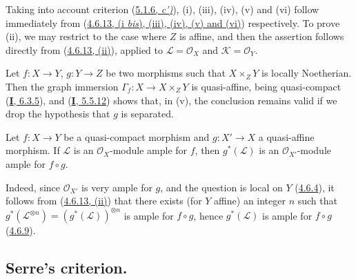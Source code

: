 Taking into account criterion (\hyperref[II.5.1.6]{5.1.6, \emph{c')}}), (i),
(iii), (iv), (v) and (vi) follow immediately from
(\hyperref[II.4.6.13]{4.6.13, (i \emph{bis}), (iii), (iv), (v) and (vi)})
respectively. To prove (ii), we may restrict to the case where $Z$ is
affine, and then the assertion follows directly from
(\hyperref[II.4.6.13]{4.6.13, (ii)}), applied to
$\mathcal{L}=\mathcal{O}_X$ and $\mathcal{K}=\mathcal{O}_Y$.

\begin{remark}[5.1.11]
\label{II.5.1.11}
Let $f:X\to Y$, $g:Y\to Z$ be two morphisms such that $X\times_ZY$ is
locally Noetherian. Then the graph immersion
$\Gamma_f:X\to X\times_ZY$ is quasi-affine, being quasi-compact
(\hyperref[I.6.3.5]{\textbf{I}, 6.3.5}), and
(\hyperref[I.5.5.12]{\textbf{I}, 5.5.12}) shows that, in (v), the conclusion remains
valid if we drop the hypothesis that $g$ is separated.
\end{remark}

\begin{proposition}[5.1.12]
\label{II.5.1.12}
Let $f:X\to Y$ be a quasi-compact morphism and $g:X'\to X$ a quasi-affine
morphism. If $\mathcal{L}$ is an $\mathcal{O}_X$-module ample for
$f$, then $g^*(\mathcal{L})$ is an $\mathcal{O}_{X'}$-module ample for
$f\circ g$.
\end{proposition}

Indeed, since $\mathcal{O}_{X'}$ is very ample for $g$, and the
question is local on $Y$ (\hyperref[II.4.6.4]{4.6.4}), it follows from
(\hyperref[II.4.6.13]{4.6.13, (ii)}) that there exists (for $Y$ affine) an
integer $n$ such that $g^*(\mathcal{L}^{\otimes n})=(g^*(\mathcal{L}))^{\otimes n}$ is ample for
$f\circ g$, hence $g^*(\mathcal{L})$ is ample for $f\circ g$
(\hyperref[II.4.6.9]{4.6.9}).


\subsection{Serre's criterion.}
\label{subsection:II.5.2}

